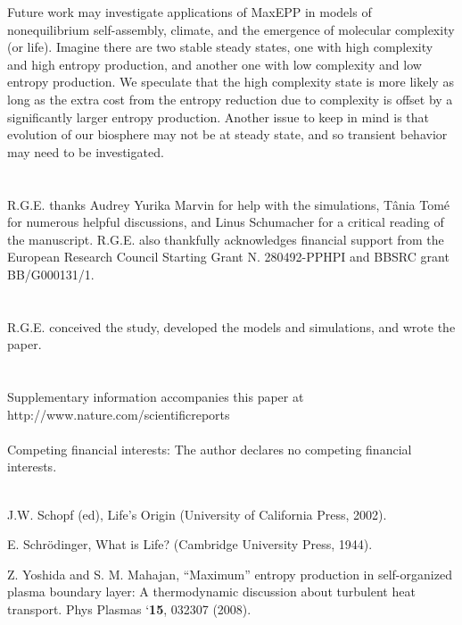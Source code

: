 \documentclass[aps,prl,reprint,singlecolumn,superscriptaddress]{revtex4}
\begin{document}
{Future work may investigate applications of MaxEPP in models of nonequilibrium self-assembly, climate, and the
emergence of molecular complexity (or life). Imagine there are two stable steady states, 
one with high complexity and high entropy production, and another one with low complexity and low entropy production. We 
speculate that the high complexity state is more likely as long as the extra cost from the entropy
reduction due to complexity is offset by a significantly larger entropy production. Another issue to keep in mind is that 
evolution of our biosphere may not be at steady state, and so transient behavior may need to be investigated.
\ \\ \ \\


 \\
R.G.E. thanks Audrey Yurika Marvin for help with the simulations, T\^ania Tom\'e for 
numerous helpful discussions, and Linus Schumacher for a critical reading of the manuscript. R.G.E. also thankfully acknowledges 
financial support from the European Research Council Starting Grant N. 280492-PPHPI and BBSRC grant BB/G000131/1.\\
\ \\
\\
R.G.E. conceived the study, developed the models and simulations, and wrote the paper.\\
\ \\
\\
Supplementary information accompanies this paper at http://www.nature.com/scientificreports\\
\ \\
Competing financial interests: The author declares no competing financial interests.
\ \\ \ \\


\begin{thebibliography}{}

 J.W. Schopf (ed), Life’s Origin (University of California Press, 2002).

 E. Schr\"odinger, What is Life? (Cambridge University Press, 1944).

 Z. Yoshida and S. M. Mahajan, {``Maximum'' entropy production in self-organized plasma boundary layer: 
A thermodynamic discussion about turbulent heat transport.} Phys Plasmas `{\bf 15}, 032307 (2008).


\end{thebibliography}}
\end{document}
